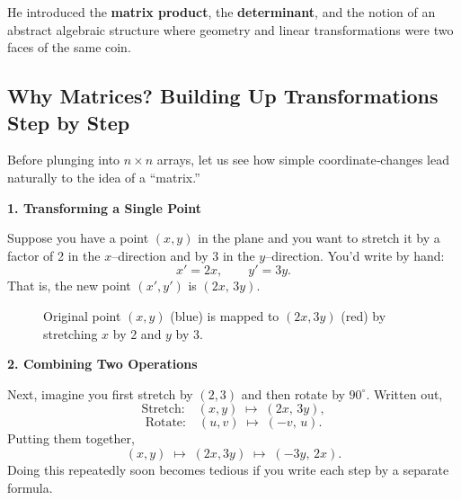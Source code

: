 He introduced the \textbf{matrix product}, the \textbf{determinant}, and the notion of an abstract algebraic structure  
where geometry and linear transformations were two faces of the same coin.


\subsection{Why Matrices? Building Up Transformations Step by Step}

Before plunging into \(n\times n\) arrays, let us see how simple coordinate‐changes lead naturally to the idea of a “matrix.”

\bigskip
\noindent\textbf{1. Transforming a Single Point}

Suppose you have a point \((x,y)\) in the plane and you want to stretch it by a factor of 2 in the \(x\)–direction and by 3 in the \(y\)–direction.  You’d write by hand:
\[
x' = 2x,
\qquad
y' = 3y.
\]
That is, the new point \((x',y')\) is \((2x,\,3y)\).

\begin{figure}[H]
    \centering
    \caption{Original point $(x,y)$ (blue) is mapped to $(2x,3y)$ (red) by stretching $x$ by 2 and $y$ by 3.}
\end{figure}


\medskip
\noindent\textbf{2. Combining Two Operations}

Next, imagine you first stretch by \((2,3)\) and then rotate by \(90^\circ\).  Written out,
\[
\text{Stretch:}\quad (x,y)\;\mapsto\;(2x,\,3y),
\]
\[
\text{Rotate:}\quad (u,v)\;\mapsto\;(-v,\,u).
\]
Putting them together,
\[
(x,y)\;\mapsto\;(2x,3y)\;\mapsto\;(-3y,\,2x).
\]
Doing this repeatedly soon becomes tedious if you write each step by a separate formula.


